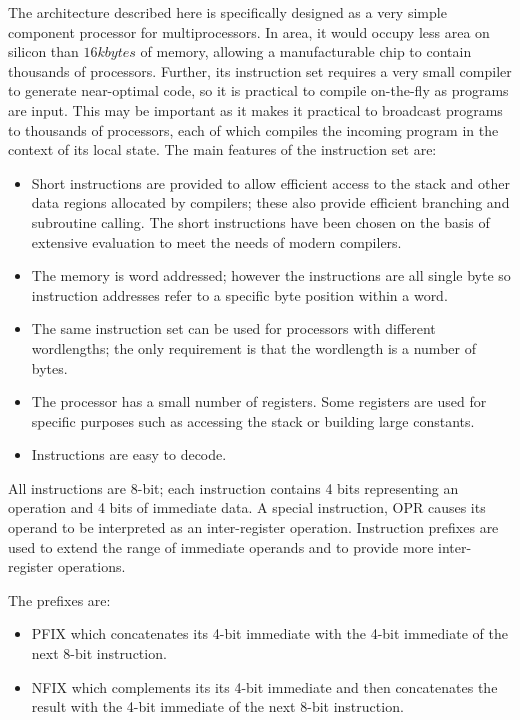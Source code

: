 \documentclass[a4paper, 12pt]{article}
\begin{document}
The architecture described here is specifically designed as a very
simple component processor for multiprocessors. In area, it 
would occupy less area on silicon than $16kbytes$ of memory,
allowing a manufacturable chip to contain thousands 
of  processors.
Further, its instruction set requires a very small compiler to
generate near-optimal code, so it is practical to compile 
on-the-fly as programs are input. This may be important 
as it makes it practical to broadcast programs to 
thousands of processors, each of which compiles the
incoming program in the context of its local state. The main
features of the instruction set are: 

\begin{itemize}

\item Short instructions are provided to allow efficient
access to the stack and other data regions allocated
by compilers; these also provide efficient branching and 
subroutine calling. The short instructions have been chosen on 
the basis of extensive evaluation to meet the needs of 
modern compilers. 

\item The memory is word addressed; however the 
instructions are all single byte so instruction 
addresses refer to a specific byte position within a 
word. 

\item The same instruction set can be used for processors 
with different wordlengths; the only requirement is that 
the wordlength is a number of bytes. 

\item The processor has a small number of registers. 
Some registers are used for specific purposes such as 
accessing the stack or building large constants. 

\item Instructions are easy to decode. 

\end{itemize}

All instructions are 8-bit; each instruction contains 4 bits representing
an operation and 4 bits of immediate data. A special instruction, OPR
causes its operand to be interpreted as an inter-register operation. 
Instruction prefixes are used to extend the range of immediate operands 
and to provide more inter-register operations. 

The prefixes are:

\begin{itemize}
\item PFIX which concatenates its 4-bit immediate with the 4-bit immediate
of the next 8-bit instruction.
\item NFIX which complements its its 4-bit immediate and then concatenates 
the result with the 4-bit immediate of the next 8-bit instruction. 
\end{itemize}
\end{document}
